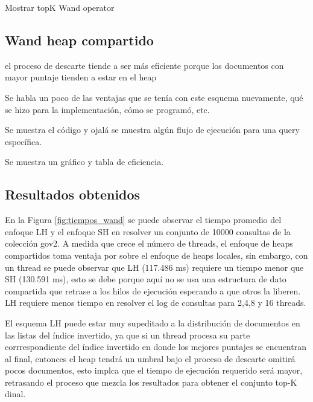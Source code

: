   







Mostrar topK Wand operator



\subsection{Wand heap compartido}
\label{evaluacionexperimental:whc}

 el proceso de descarte tiende a ser más eficiente porque los documentos con mayor puntaje tienden a estar en el heap

Se habla un poco de las ventajas que se tenía con este esquema nuevamente, qué se hizo para la implementación, cómo se programó, etc. 

Se muestra el código y ojalá se muestra algún flujo de ejecución para una query específica.

%

Se muestra un gráfico y tabla de eficiencia.



\subsection{Resultados obtenidos}
\label{evaluacionexperimental:resultadosObtenidos}

En la Figura \ref{fig:tiempos_wand} se puede observar el tiempo promedio del enfoque LH y el enfoque SH en resolver un conjunto de 10000 consultas de la colección gov2. A medida que crece el número de threads, el enfoque de heaps compartidos toma ventaja por sobre el enfoque de heaps locales, sin embargo, con un thread se puede observar que LH (117.486 ms) requiere un tiempo menor que SH (130.591 ms), esto se debe porque aquí no se usa una estructura de dato compartida que retrase a los hilos de ejecución esperando a que otros la liberen. LH requiere menos tiempo en resolver el log de consultas para 2,4,8 y 16 threads. 

El esquema LH puede estar muy supeditado a la distribución de documentos en las listas del índice invertido, ya que si un thread procesa su parte corrrespondiente del índice invertido en donde los mejores puntajes se encuentran al final, entonces el heap tendrá un umbral bajo el proceso de descarte omitirá pocos documentos, esto implca que el tiempo de ejecución requerido será mayor, retrasando el proceso que mezcla los resultados para obtener el conjunto top-K dinal. 

